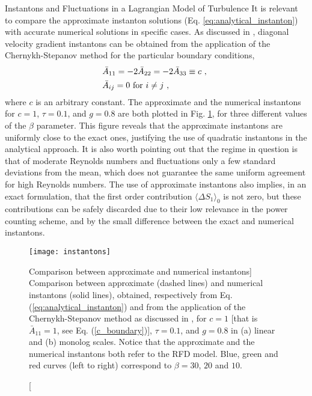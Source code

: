 \begin{chapter}{Instantons and Fluctuations in a Lagrangian Model of Turbulence}
It is relevant to compare the approximate instanton solutions (Eq. \ref{eq:analytical_instanton}) with accurate numerical solutions in specific cases. As discussed in \textcite{grigorio2017instantons}, diagonal velocity gradient instantons can be obtained from the application of the Chernykh-Stepanov method \parencite{chernykh2001} for the particular boundary conditions,
\begin{equation}
\begin{split} 
&\bar A_{11} = -2 \bar A_{22} = -2 \bar A_{33} \equiv c \ , \ \label{c_boundary} \\
& \bar A_{ij} = 0 {\hbox{  for $i \neq j$}} \ ,  \ 
\end{split}
\end{equation}
where $c$ is an arbitrary constant. The approximate and the numerical instantons for $c=1$, $\tau=0.1$, and $g=0.8$ are both plotted in Fig. \ref{fig:instanton}, for three different values of the $\beta$ parameter. This figure reveals that the approximate instantons are uniformly close to the exact ones, justifying the use of quadratic instantons in the analytical approach. It is also worth pointing out that the regime in question is that of moderate Reynolds numbers and fluctuations only a few standard deviations from the mean, which does not guarantee the same uniform agreement for high Reynolds numbers. The use of approximate instantons also implies, in an exact formulation, that the first order contribution $\langle \Delta S_1 \rangle_0$ is not zero, but these contributions can be safely discarded due to their low relevance in the power counting scheme, and by the small difference between the exact and numerical instantons.

\begin{figure}[ht]
 \centering
 \texttt{[image: instantons]}
 \caption
 [Comparison between approximate and numerical instantons]
 {Comparison between approximate (dashed lines) and numerical instantons (solid lines), obtained, respectively from Eq. (\ref{eq:analytical_instanton}) and from the application of the Chernykh-Stepanov method as discussed in \textcite{grigorio2017instantons}, for $c=1$ [that is $\bar A_{11} = 1$, see Eq. (\ref{c_boundary})], $\tau=0.1$, and $g=0.8$ in (a) linear and (b) monolog scales.
 Notice that the approximate and the numerical instantons both refer to the RFD model.
 Blue, green and red curves (left to right) correspond to $\beta =30$, $20$ and $10$.
 }
 \label{fig:instanton}
\end{figure}


\end{chapter}
